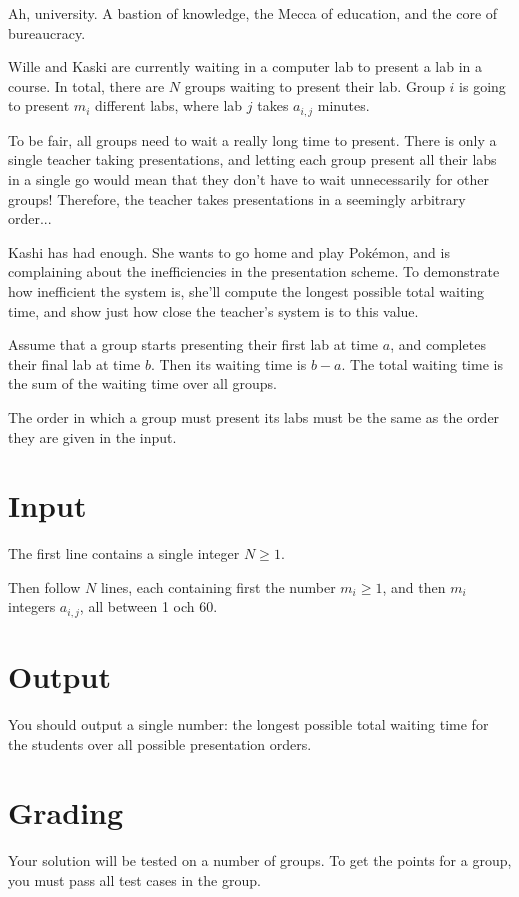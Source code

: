 Ah, university. A bastion of knowledge, the Mecca of education, and the core of bureaucracy.

Wille and Kaski are currently waiting in a computer lab to present a lab in a course. In total,
there are $N$ groups waiting to present their lab. Group $i$ is going to present $m_i$
different labs, where lab $j$ takes $a_{i, j}$ minutes.

To be fair, all groups need to wait a really long time to present.
There is only a single teacher taking presentations, and letting each group
present all their labs in a single go would mean that they don't have to wait
unnecessarily for other groups! Therefore, the teacher takes presentations in a
seemingly arbitrary order...

Kashi has had enough. She wants to go home and play Pokémon, and is complaining
about the inefficiencies in the presentation scheme. To demonstrate how inefficient the
system is, she'll compute the longest possible total waiting time, and show
just how close the teacher's system is to this value.

Assume that a group starts presenting their first lab at time $a$, and completes their
final lab at time $b$. Then its waiting time is $b - a$. The total waiting time is the sum
of the waiting time over all groups.

The order in which a group must present its labs must be the same as the order
they are given in the input.

\section*{Input}
The first line contains a single integer $N \ge 1$.

Then follow $N$ lines, each containing first the number $m_i \ge 1$, and then $m_i$ integers $a_{i,j}$, all between 1 och 60.


\section*{Output}
You should output a single number: the longest possible total waiting time for the students over all possible presentation orders.

\section*{Grading}
Your solution will be tested on a number of groups. To get the points for a group, you must pass all test cases in the group.

